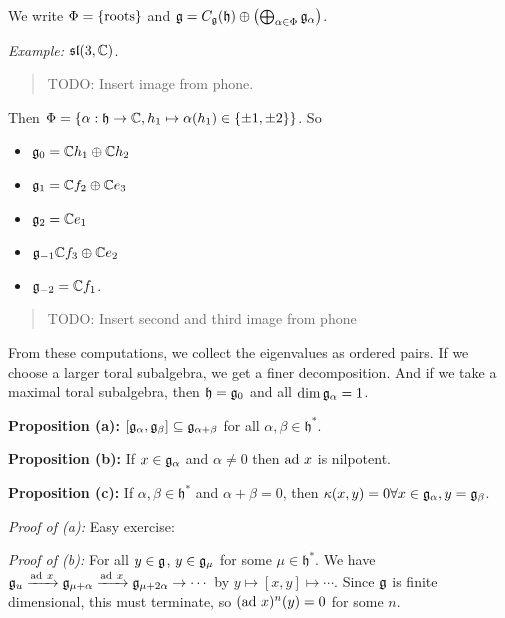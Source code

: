 We write \(\Phi = \left\{{\text{roots}}\right\}\) and
\({\mathfrak{g}} = C_{\mathfrak{g}}(\mathfrak h) \oplus \left( \bigoplus_{\alpha \in \Phi}{\mathfrak{g}}_\alpha \right)\).

\emph{Example:} \({\mathfrak{sl}}(3, {\mathbb{C}})\).

\begin{quote}
TODO: Insert image from phone.
\end{quote}

Then
\(\Phi = \left\{{\alpha: \mathfrak h \to {\mathbb{C}}, h_1 \mapsto \alpha(h_1) \in \left\{{\pm 1, \pm 2}\right\}}\right\}\).
So

\begin{itemize}
\tightlist
\item
  \({\mathfrak{g}}_0 = {\mathbb{C}} h_1 \oplus {\mathbb{C}} h_2\)
\item
  \({\mathfrak{g}}_1 = {\mathbb{C}} f_2 \oplus {\mathbb{C}} e_3\)
\item
  \({\mathfrak{g}}_2 = {\mathbb{C}} e_1\)
\item
  \({\mathfrak{g}}_{-1} {\mathbb{C}} f_3 \oplus {\mathbb{C}} e_2\)
\item
  \({\mathfrak{g}}_{-2} = {\mathbb{C}} f_1\).
\end{itemize}

\begin{quote}
TODO: Insert second and third image from phone
\end{quote}

From these computations, we collect the eigenvalues as ordered pairs. If
we choose a larger toral subalgebra, we get a finer decomposition. And
if we take a maximal toral subalgebra, then \(\mathfrak h = {\mathfrak{g}}_0\)
and all \(\dim {\mathfrak{g}}_\alpha = 1\).

\textbf{Proposition (a):}
\([{\mathfrak{g}}_\alpha, {\mathfrak{g}}_\beta] \subseteq {\mathfrak{g}}_{\alpha + \beta}\) for all
\(\alpha, \beta \in \mathfrak h^*\).

\textbf{Proposition (b):} If \(x\in {\mathfrak{g}}_\alpha\) and \(\alpha \neq 0\)
then \(\mathrm{ad}~ x\) is nilpotent.

\textbf{Proposition (c):} If \(\alpha, \beta \in \mathfrak h^*\) and
\(\alpha + \beta = 0\), then
\(\kappa(x, y) = 0 \forall x\in {\mathfrak{g}}_\alpha, y= {\mathfrak{g}}_\beta\).

\emph{Proof of (a):} Easy exercise:

\emph{Proof of (b):} For all \(y \in {\mathfrak{g}}\), \(y \in {\mathfrak{g}}_\mu\) for
some \(\mu \in \mathfrak h^*\). We have
\({\mathfrak{g}}_u \xrightarrow{\mathrm{ad}~ x} {\mathfrak{g}}_{\mu + \alpha} \xrightarrow{\mathrm{ad}~ x} {\mathfrak{g}}_{\mu + 2\alpha} \to \cdots\)
by \(y \mapsto [x,y] \mapsto \cdots\). Since \({\mathfrak{g}}\) is finite
dimensional, this must terminate, so \((\mathrm{ad}~ x)^n(y) = 0\) for some
\(n\).

